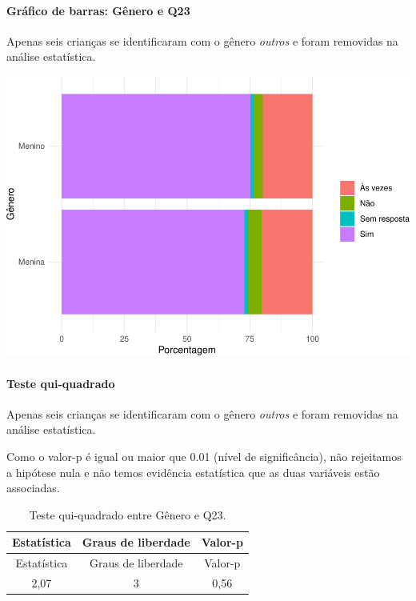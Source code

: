 \documentclass[]{article}
\let\oldparagraph\paragraph
\renewcommand{\paragraph}[1]{\oldparagraph{#1}\mbox{}}
\begin{document}
\hypertarget{gruxe1fico-de-barras-guxeanero-e-q23}{%
\paragraph{Gráfico de barras: Gênero e Q23}\label{gruxe1fico-de-barras-guxeanero-e-q23}}

Apenas seis crianças se identificaram com o gênero \emph{outros} e foram removidas na análise estatística.

\begin{center}\includegraphics[width=0.75\linewidth]{relatorio_covid19_files/figure-latex/unnamed-chunk-554-1} \end{center}

\hypertarget{teste-qui-quadrado-48}{%
\paragraph{Teste qui-quadrado}\label{teste-qui-quadrado-48}}

Apenas seis crianças se identificaram com o gênero \emph{outros} e foram removidas na análise estatística.

Como o valor-p é igual ou maior que 0.01 (nível de significância), não rejeitamos a hipótese nula e não temos evidência estatística que as duas variáveis estão associadas.

\begin{longtable}[]{@{}ccc@{}}
\caption{\label{tab:unnamed-chunk-556}Teste qui-quadrado entre Gênero e Q23.}\tabularnewline
\toprule
Estatística & Graus de liberdade & Valor-p\tabularnewline
\midrule
\endfirsthead
\toprule
Estatística & Graus de liberdade & Valor-p\tabularnewline
\midrule
\endhead
2,07 & 3 & 0,56\tabularnewline
\bottomrule
\end{longtable}

\cleardoublepage
\end{document}
